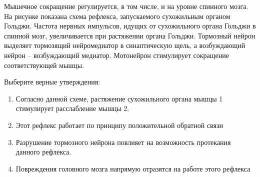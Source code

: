 
Мышечное
сокращение регулируется, в том числе, и на уровне спинного мозга. На рисунке
показана схема рефлекса, запускаемого сухожильным органом Гольджи. Частота
нервных импульсов, идущих от сухожильного органа Гольджи в спинной мозг,
увеличивается при растяжении органа Гольджи. Тормозный нейрон выделяет
тормозящий нейромедиатор в синаптическую щель, а возбуждающий нейрон –
возбуждающий медиатор. Мотонейрон стимулирует сокращение соответствующей мышцы.


Выберите
верные утверждения:

\begin{enumerate}
    \item Согласно данной схеме, растяжение сухожильного органа мышцы 1 стимулирует расслабление мышцы 2.
    \item Этот рефлекс работает по принципу положительной обратной связи 
    \item Разрушение тормозного нейрона повлияет на возможность протекания данного рефлекса.
    \item Повреждения головного мозга напрямую отразятся на работе этого рефлекса
\end{enumerate}



